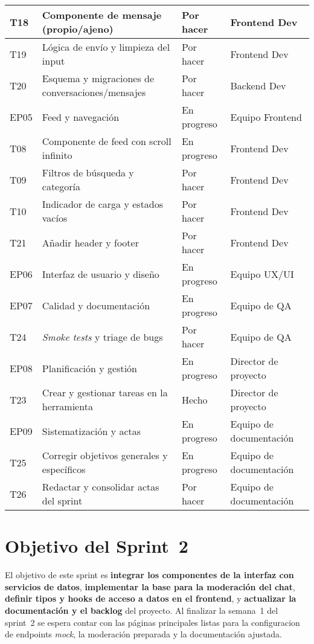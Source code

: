 \documentclass{article}
\begin{document}
\begin{longtable}{|p{}|p{}|p{}|p{}|}
\hline
T18 & Componente de mensaje (propio/ajeno)               & Por hacer      & Frontend Dev      \\
\hline
T19 & L\'ogica de env\'io y limpieza del input               & Por hacer      & Frontend Dev      \\
\hline
T20 & Esquema y migraciones de conversaciones/mensajes   & Por hacer      & Backend Dev       \\
\hline
EP05 & Feed y navegaci\'on                                  & En progreso & Equipo Frontend     \\
\hline
T08 & Componente de feed con scroll infinito             & En progreso & Frontend Dev      \\
\hline
T09 & Filtros de b\'usqueda y categor\'ia                    & Por hacer      & Frontend Dev      \\
\hline
T10 & Indicador de carga y estados vac\'ios                & Por hacer      & Frontend Dev      \\
\hline
T21 & A\~nadir header y footer                             & Por hacer      & Frontend Dev      \\
\hline
EP06 & Interfaz de usuario y dise\~no                       & En progreso & Equipo UX/UI        \\
\hline
EP07 & Calidad y documentaci\'on                            & En progreso & Equipo de QA           \\
\hline
T24 & \emph{Smoke tests} y triage de bugs                       & Por hacer      & Equipo de QA           \\
\hline
EP08 & Planificaci\'on y gesti\'on                            & En progreso & Director de proyecto   \\
\hline
T23 & Crear y gestionar tareas en la herramienta         & Hecho        & Director de proyecto   \\
\hline
EP09 & Sistematizaci\'on y actas                            & En progreso & Equipo de documentaci\'on \\
\hline
T25 & Corregir objetivos generales y espec\'ificos         & En progreso & Equipo de documentaci\'on \\
\hline
T26 & Redactar y consolidar actas del sprint             & Por hacer      & Equipo de documentaci\'on \\
\hline
\end{longtable}

\section*{Objetivo del Sprint 2}
El objetivo de este sprint es \textbf{integrar los componentes de la interfaz con servicios de datos}, \textbf{implementar la base para la moderación del chat}, \textbf{definir tipos y hooks de acceso a datos en el frontend}, y \textbf{actualizar la documentación y el backlog} del proyecto.  Al finalizar la semana 1 del sprint 2 se espera contar con las páginas principales listas para la configuracion de endpoints \emph{mock}, la moderación preparada y la documentación ajustada.
\end{document}
